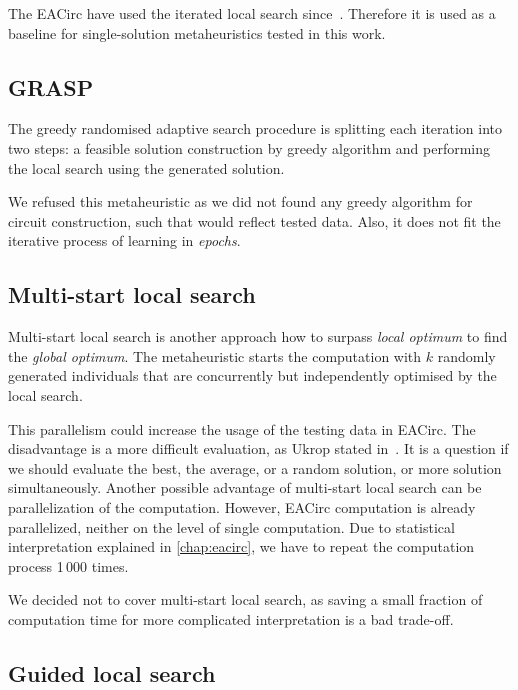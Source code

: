 \documentclass[
    digital,    %
    oneside,    %
    color,
    11pt,
    nocover,
    notable,
    nolof,
    nolot,
]{fithesis3}
\begin{document}
The EACirc have used the iterated local search since~\cite{sys2014constructing}. Therefore it is used as a baseline for single-solution metaheuristics tested in this work.

\subsection{GRASP}
\label{subsec:opt-single-sol-grasp}

The greedy randomised adaptive search procedure is splitting each iteration into two steps: a feasible solution construction by greedy algorithm and performing the local search using the generated solution.

We refused this metaheuristic as we did not found any greedy algorithm for circuit construction, such that would reflect tested data. Also, it does not fit the iterative process of learning in \textit{epochs}.

\subsection{Multi-start local search}
\label{subsec:opt-single-sol-msls}

Multi-start local search is another approach how to surpass \textit{local optimum} to find the \textit{global optimum}. The metaheuristic starts the computation with $k$ randomly generated individuals that are concurrently but independently optimised by the local search.

This parallelism could increase the usage of the testing data in EACirc. The disadvantage is a more difficult evaluation, as Ukrop stated in~\cite[Chapter~5]{ukropBcThesis}. It is a question if we should evaluate the best, the average, or a random solution, or more solution simultaneously. Another possible advantage of multi-start local search can be parallelization of the computation. However, EACirc computation is already parallelized, neither on the level of single computation. Due to statistical interpretation explained in \cref{chap:eacirc}, we have to repeat the computation process 1\,000 times.

We decided not to cover multi-start local search, as saving a small fraction of computation time for more complicated interpretation is a bad trade-off.

\subsection{Guided local search}
\label{subsec:opt-single-sol-gls}
\end{document}
